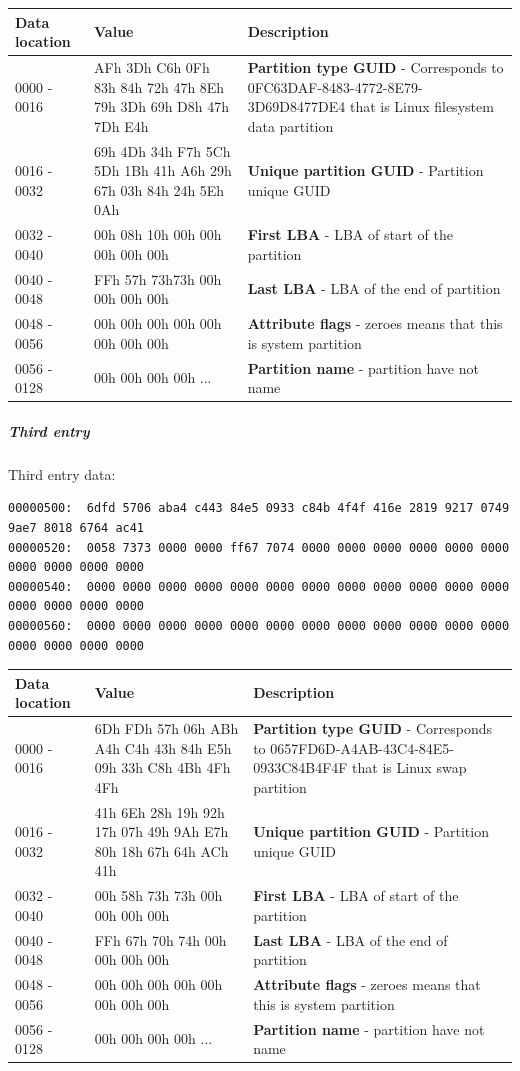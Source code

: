 \documentclass[a4paper,11pt]{article}
\theoremstyle{mytheor}
\begin{document}
\begin{longtable}{| p{3cm} | p{2cm} | p{10cm} |} \hline
  Data location & Value & Description\\ \hline
  0000 - 0016 & AFh 3Dh C6h 0Fh 83h 84h 72h 47h 8Eh 79h 3Dh 69h D8h 47h 7Dh E4h  & \textbf{Partition type GUID} - Corresponds to 0FC63DAF-8483-4772-8E79-3D69D8477DE4 that is Linux filesystem data partition\\ \hline
  0016 - 0032 & 69h 4Dh 34h F7h 5Ch 5Dh 1Bh 41h A6h 29h 67h 03h 84h 24h 5Eh 0Ah & \textbf{Unique partition GUID} - Partition unique GUID\\ \hline
  0032 - 0040 & 00h 08h 10h 00h 00h 00h 00h 00h & \textbf{First LBA} - LBA of start of the partition\\ \hline
  0040 - 0048 & FFh 57h 73h73h 00h 00h 00h 00h & \textbf{Last LBA} - LBA of the end of partition\\ \hline
  0048 - 0056 & 00h 00h 00h 00h 00h 00h 00h 00h & \textbf{Attribute flags} - zeroes means that this is system partition\\ \hline
  0056 - 0128 & 00h 00h 00h 00h ... & \textbf{Partition name} - partition have not name\\ \hline
\end{longtable}

\subparagraph{Third entry} Third entry data:

\begin{lstlisting}
00000500:  6dfd 5706 aba4 c443 84e5 0933 c84b 4f4f 416e 2819 9217 0749 9ae7 8018 6764 ac41
00000520:  0058 7373 0000 0000 ff67 7074 0000 0000 0000 0000 0000 0000 0000 0000 0000 0000
00000540:  0000 0000 0000 0000 0000 0000 0000 0000 0000 0000 0000 0000 0000 0000 0000 0000
00000560:  0000 0000 0000 0000 0000 0000 0000 0000 0000 0000 0000 0000 0000 0000 0000 0000
\end{lstlisting}

\begin{longtable}{| p{3cm} | p{2cm} | p{10cm} |} \hline
  Data location & Value & Description\\ \hline
  0000 - 0016 & 6Dh FDh 57h 06h ABh A4h C4h 43h 84h E5h 09h 33h C8h 4Bh 4Fh 4Fh & \textbf{Partition type GUID} - Corresponds to 0657FD6D-A4AB-43C4-84E5-0933C84B4F4F that is Linux swap partition\\ \hline
  0016 - 0032 & 41h 6Eh 28h 19h 92h 17h 07h 49h 9Ah E7h 80h 18h 67h 64h ACh 41h & \textbf{Unique partition GUID} - Partition unique GUID\\ \hline
  0032 - 0040 & 00h 58h 73h 73h 00h 00h 00h 00h & \textbf{First LBA} - LBA of start of the partition\\ \hline
  0040 - 0048 & FFh 67h 70h 74h 00h 00h 00h 00h & \textbf{Last LBA} - LBA of the end of partition\\ \hline
  0048 - 0056 & 00h 00h 00h 00h 00h 00h 00h 00h & \textbf{Attribute flags} - zeroes means that this is system partition\\ \hline
  0056 - 0128 & 00h 00h 00h 00h ... & \textbf{Partition name} - partition have not name\\ \hline
\end{longtable}
\end{document}
